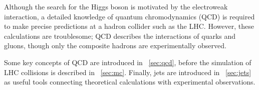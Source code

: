 
Although the search for the Higgs boson is motivated by the electroweak interaction, a
detailed knowledge of quantum chromodynamics (QCD) is required to make precise predictions 
at a hadron collider such as the LHC. However, these calculations are troublesome; QCD 
describes the interactions of quarks and gluons, though only the composite hadrons are 
experimentally observed.

Some key concepts of QCD are introduced in \Section~\ref{sec:qcd}, before the 
simulation of LHC collisions is described in \Section~\ref{sec:mc}. Finally, jets are 
introduced in \Section~\ref{sec:jets} as useful tools connecting theoretical calculations 
with experimental observations.

